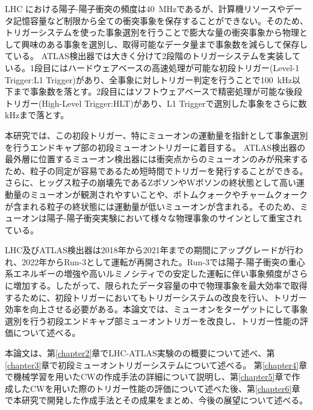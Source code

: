 LHC における陽子-陽子衝突の頻度は40~MHzであるが、計算機リソースやデータ記憶容量など制限から全ての衝突事象を保存することができない。そのため、トリガーシステムを使った事象選別を行うことで膨大な量の衝突事象から物理として興味のある事象を選別し、取得可能なデータ量まで事象数を減らして保存している。
ATLAS検出器では大きく分けて2段階のトリガーシステムを実装している。1段目にはハードウェアベースの高速処理が可能な初段トリガー(Level-1 Trigger:L1 Trigger)があり、全事象に対しトリガー判定を行うことで100~kHz以下まで事象数を落とす。2段目にはソフトウェアベースで精密処理が可能な後段トリガー(High-Level Trigger:HLT)があり、L1 Triggerで選別した事象をさらに数kHzまで落とす。

本研究では、この初段トリガー、特にミューオンの運動量を指針として事象選別を行うエンドキャプ部の初段ミューオントリガーに着目する。
ATLAS検出器の最外層に位置するミューオン検出器には衝突点からのミューオンのみが飛来するため、粒子の同定が容易であるため短時間でトリガーを発行することができる。さらに、ヒッグス粒子の崩壊先であるZボソンやWボソンの終状態として高い運動量のミューオンが観測されやすいことや、ボトムクォークやチャームクォークが含まれる粒子の終状態には運動量が低いミューオンが含まれる。そのため、ミューオンは陽子-陽子衝突実験において様々な物理事象のサインとして重宝されている。

LHC及びATLAS検出器は2018年から2021年までの期間にアップグレードが行われ、2022年からRun-3として運転が再開された。Run-3では陽子-陽子衝突の重心系エネルギーの増強や高いルミノシティでの安定した運転に伴い事象頻度がさらに増加する。したがって、限られたデータ容量の中で物理事象を最大効率で取得するために、初段トリガーにおいてもトリガーシステムの改良を行い、トリガー効率を向上させる必要がある。本論文では、ミューオンをターゲットにして事象選別を行う初段エンドキャプ部ミューオントリガーを改良し、トリガー性能の評価について述べる。

本論文は、第\ref{chapter2}章でLHC-ATLAS実験のの概要について述べ、第\ref{chapter3}章で初段ミューオントリガーシステムについて述べる。
第\ref{chapter4}章で機械学習を用いたCWの作成手法の詳細について説明し、第\ref{chapter5}章で作成したCWを用いた際のトリガー性能の評価について述べた後、第\ref{chapter6}章で本研究で開発した作成手法とその成果をまとめ、今後の展望について述べる。


